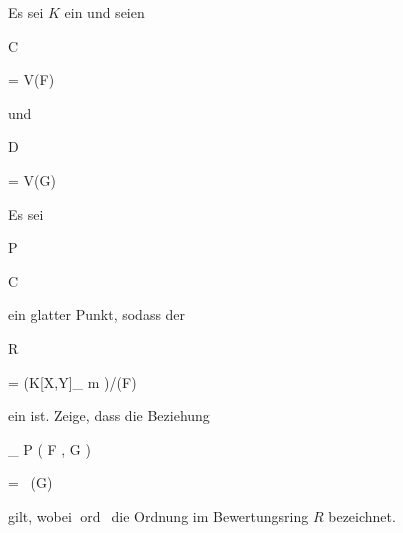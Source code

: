 {


Es sei $K$ ein
und seien


\mavergleichskette

{\vergleichskette

{ C
}

{ = }{ V(F)
}

{  }{
}

{    }{
}

{   }{
}

}
{}{}{}
und


\mavergleichskette

{\vergleichskette

{ D
}

{ = }{ V(G)
}

{  }{
}

{    }{
}

{   }{
}

}
{}{}{}
Es sei


\mavergleichskette

{\vergleichskette

{ P
}

{ \in }{ C
}

{  }{
}

{    }{
}

{   }{
}

}
{}{}{}
ein glatter Punkt, sodass der


\mavergleichskette

{\vergleichskette

{ R
}

{ = }{ (K[X,Y]_{ {\mathfrak m} } )/(F)
}

{  }{
}

{    }{
}

{   }{
}

}
{}{}{}
ein
ist. Zeige, dass die Beziehung


\mavergleichskettedisp

{\vergleichskette

{  _{ { P} }  (   F ,  G  )
}

{ =} {  \, (G)
}

{ } {
}

{ } {
}

{ } {
}

}
{}{}{}
gilt, wobei $\operatorname{ord} \,$ die Ordnung im Bewertungsring $R$ bezeichnet.


}

